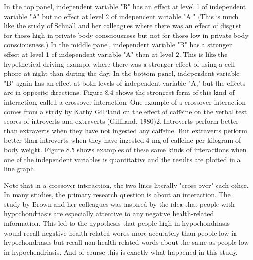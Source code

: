 In the top panel, independent variable "B" has an effect at level 1 of independent variable "A" but no effect at level 2 of independent variable "A." (This is much like the study of Schnall and her colleagues where there was an effect of disgust for those high in private body consciousness but not for those low in private body consciousness.) In the middle panel, independent variable "B" has a stronger effect at level 1 of independent variable "A" than at level 2. This is like the hypothetical driving example where there was a stronger effect of using a cell phone at night than during the day. In the bottom panel, independent variable "B" again has an effect at both levels of independent variable "A," but the effects are in opposite directions. Figure 8.4 shows the strongest form of this kind of interaction, called a crossover interaction. One example of a crossover interaction comes from a study by Kathy Gilliland on the effect of caffeine on the verbal test scores of introverts and extraverts (Gilliland, 1980)2. Introverts perform better than extraverts when they have not ingested any caffeine. But extraverts perform better than introverts when they have ingested 4 mg of caffeine per kilogram of body weight.
Figure 8.5 shows examples of these same kinds of interactions when one of the independent variables is quantitative and the results are plotted in a line graph. 



Note that in a crossover interaction, the two lines literally "cross over" each other.
In many studies, the primary research question is about an interaction. The study by Brown and her colleagues was inspired by the idea that people with hypochondriasis are especially attentive to any negative health-related information. This led to the hypothesis that people high in hypochondriasis would recall negative health-related words more accurately than people low in hypochondriasis but recall non-health-related words about the same as people low in hypochondriasis. And of course this is exactly what happened in this study.

\subsection{}

